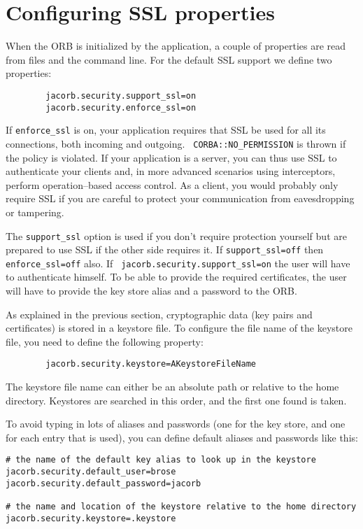 \documentclass[12pt]{scrbook}
\begin{document}
\section{Configuring SSL properties}

When the ORB is initialized by the application, a couple of properties
are read from files and the  command line. For the default SSL support
we define two properties:

\begin{verbatim}
        jacorb.security.support_ssl=on
        jacorb.security.enforce_ssl=on    
\end{verbatim}

If {\tt  enforce\_ssl} is  on, your application  requires that  SSL be
used  for  all  its  connections,  both incoming  and  outgoing.  {\tt
CORBA::NO\_PERMISSION} is  thrown if the  policy is violated.  If your
application is  a server,  you can thus  use SSL to  authenticate your
clients and,  in more  advanced scenarios using  interceptors, perform
operation--based access control. As  a client, you would probably only
require  SSL if  you are  careful to  protect your  communication from
eavesdropping or tampering.

The {\tt support\_ssl} option is  used if you don't require protection
yourself but  are prepared to use  SSL if the other  side requires it.
If {\tt  support\_ssl=off} then {\tt enforce\_ssl=off}  also.  If {\tt
jacorb.security.support\_ssl=on}  the user  will have  to authenticate
himself. To  be able  to provide the  required certificates,  the user
will have to provide the key store alias and a password to the ORB.

As explained  in the previous  section, cryptographic data  (key pairs
and  certificates) is  stored in  a  keystore  file. To configure the
file name of the keystore file, you need to define the following
property:

\begin{verbatim}
        jacorb.security.keystore=AKeystoreFileName
\end{verbatim}

The keystore file name can either be an absolute path or relative to
the home directory. Keystores are searched in this order, and the
first one found is taken.

To avoid  typing in  lots of  aliases and passwords  (one for  the key
store, and  one for each entry  that is used), you  can define default
aliases and passwords like this:

\begin{verbatim}
# the name of the default key alias to look up in the keystore
jacorb.security.default_user=brose
jacorb.security.default_password=jacorb

# the name and location of the keystore relative to the home directory
jacorb.security.keystore=.keystore
\end{verbatim}
\end{document}

